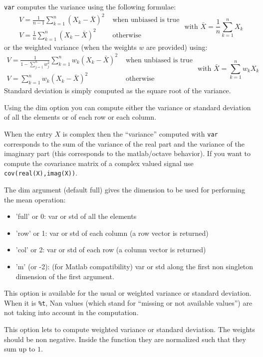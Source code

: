 \begin{mandescription}
  \verb+var+ computes the variance using the following formulae:
$$
\begin{array}{ll}
    V = \frac{1}{n-1} \sum_{k=1}^n (X_k - \bar{X})^2  &  \mbox{ when unbiased is true} \\ 
    V = \frac{1}{n} \sum_{k=1}^n (X_k - \bar{X})^2  &  \mbox{ otherwise} 
\end{array} \mbox{ with }  \bar{X} = \frac{1}{n} \sum_{k=1}^n X_k
$$ 
or the weighted variance (when the weights $w$ are provided) using:
$$
\begin{array}{ll}
    V = \frac{1}{1- \sum_{j=1}^n w_j^2} \sum_{k=1}^n w_k (X_k - \bar{X})^2  &  \mbox{ when unbiased is true} \\ 
    V =                                \sum_{k=1}^n w_k (X_k - \bar{X})^2  &  \mbox{ otherwise} 
\end{array} \mbox{ with }  \bar{X} = \sum_{k=1}^n w_k X_k
$$ 
Standard deviation is simply computed as the square root of the variance.

Using the dim option you can compute either the variance or standard deviation
of all the elements or of each row or each column. 

When the entry $X$ is complex then the ``variance'' computed with \verb+var+ corresponds 
to the sum of the variance of the real part and the variance of the imaginary part (this 
corresponds to the matlab/octave behavior). If you want to compute the covariance matrix 
of a complex valued signal use \verb+cov(real(X),imag(X))+.

  The dim argument (default full) gives the dimension to be used for performing the mean operation:
  \begin{itemize}
    \item 'full' or 0: var or std of all the elements 
    \item 'row' or 1: var or std of each column (a row vector is returned)
    \item 'col' or 2: var or std of each row (a column vector is returned)
    \item 'm' (or -2): (for Matlab compatibility) var or std along the first non 
          singleton dimension of the first argument.
  \end{itemize}

   This option is available for the usual or weighted variance or standard deviation. 
When it is \verb+%t+,  Nan values (which stand for ``missing or not available values'') 
are not taking into account in the computation.
   
  This option lets to compute weighted variance or standard deviation. The weights should be non negative. Inside
the function they are normalized such that they sum up to $1$.
   
\end{mandescription}

